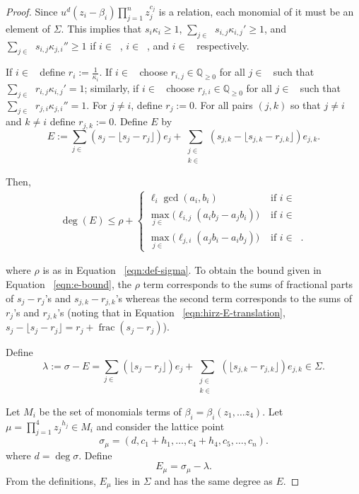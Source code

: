 \documentclass{amsart}
\theoremstyle{plain}
\theoremstyle{definition}
\theoremstyle{remark}
\numberwithin{equation}{subsection}
\newcommand\bq{{\mathbb Q}}
\newcommand\bida{a}
\newcommand\bidb{b}
\DeclareMathOperator{\fr}{frac}
\DeclareMathOperator{\Te}{T_=}
\DeclareMathOperator{\Tp}{T_+}
\DeclareMathOperator{\Tm}{T_-}
\begin{document}
\begin{proof}
Since $u^d (z_i - \beta_i)\prod_{j=1}^n z_j^{c_j}$ is a relation, each monomial of it must be an element of $\Sigma$. This implies that $s_i\kappa_i\ge 1$, $\sum_{j\in \Tm} s_{i,j}\kappa_{i,j}' \ge 1$, and $\sum_{j\in \Tp} s_{i,j}\kappa_{j,i}'' \ge 1$ if $i\in \Te$, $i\in \Tp$, and $i\in \Tm$ respectively.

If $i\in \Te$ define $r_i := \frac{1}{\kappa_i}$.  If $i\in \Tp$ choose $r_{i,j}\in \bq_{\ge 0}$ for all $j\in \Tm$ such that $\sum_{j\in \Tm} r_{i,j}\kappa_{i,j}' = 1$; similarly, if $i\in \Tm$ choose $r_{j,i}\in \bq_{\ge 0}$ for all $j\in \Tp$ such that $\sum_{j\in \Tm} r_{j,i}\kappa_{j,i}'' = 1$.  For $j\ne i$, define $r_j := 0.$ For all pairs $(j,k)$ so that $j \neq i$ and $k \neq i$ define $r_{j,k} := 0$.
Define $E$ by
\begin{equation}\label{eqn:hirz-E-translation}
	E := \sum_{j\in \Te} (s_j - \lfloor s_j - r_j \rfloor) e_j + \sum_{\substack{j \in 
	\Tp \\ k \in \Tm}} (s_{j,k} - \lfloor s_{j,k} - r_{j,k} \rfloor) e_{j,k}.
\end{equation}

Then,
\begin{align}
\label{eqn:e-bound}
	\deg(E) \le \rho + \begin{cases}
	\ell_i \gcd(\bida_i, \bidb_i)	&\mbox{ if } i \in \Te \\
	\max_{j \in \Tm} \bigl(\ell_{i, j} (\bida_i \bidb_j - \bida_j \bidb_i)\bigr)
	&\mbox{ if } i \in \Tp \\
	\max_{j \in \Tp} \bigl(\ell_{j, i} (\bida_j \bidb_ i - \bida_i \bidb_j) \bigr)
	&\mbox{ if } i \in \Tm. \end{cases}
\end{align}

\noindent
where $\rho$ is as in Equation ~\eqref{eqn:def-sigma}. To obtain the
bound given in Equation ~\eqref{eqn:e-bound}, the $\rho$ term 
corresponds to the sums of fractional parts of $s_j - r_j$'s and $s_
{j, k} - r_{j, k}$'s whereas the second term corresponds to the sums 
of $r_j$'s and $r_{j, k}$'s (noting that in Equation
~\ref{eqn:hirz-E-translation}, $s_j - \lfloor s_j - r_j \rfloor =
r_j + \fr(s_j - r_j)$).

Define
\[
	\lambda := \sigma - E = \sum_{j \in \Te} (\lfloor s_j - r_j \rfloor)
	e_j + \sum_{\substack{j \in \Tp \\ k \in \Tm}} ( \lfloor s_{j, k} -
	r_{j, k} \rfloor) e_{j, k} \in \Sigma.
\]

\noindent
Let $M_i$ be the set of monomials terms of $\beta_i = \beta_i(z_1, \ldots z_4)$.  Let $\mu = \prod_{j=1}^4
{z_j}^{h_j}\in M_i$ and consider the lattice point 
\[
	\sigma_\mu = (d, c_1 + h_1, \ldots, c_4+h_4, c_5, \ldots, c_n).
\]
where $d = \deg \sigma$.
Define 
\[
	E_\mu = \sigma_\mu - \lambda.
\]
From the definitions, $E_\mu$ lies in $\Sigma$ 
and has the same degree as $E$.


\end{proof}
\end{document}

